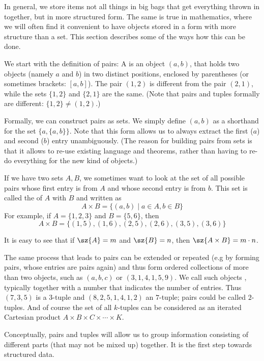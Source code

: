 In general, we store items not all things in big bags that get everything thrown in
together, but in more structured form. The same is true in mathematics,
where we will often find it convenient to have objects stored in a form with
more structure than a set. This section describes some of the ways how this
can be done.

We start with the definition of pairs: A  is an object $(a,b)$,
that holds two objects (namely $a$ and $b$) in two distinct positions,
enclosed by parentheses (or sometimes brackets: $[a,b]$). The
pair $(1,2)$ is different from the pair $(2,1)$, while the sets $\{1,2\}$
and $\{2,1\}$ are the same. (Note that pairs and tuples formally are
different: $\{1,2\}\not=(1,2)$.)

Formally, we can construct pairs as sets. We simply define $(a,b)$ as a
shorthand for the set $\{a,\{a,b\}\}$. Note that this form allows us to
always extract the first ($a$) and second ($b$) entry unambiguously. (The
reason for building pairs from sets is that it allows to re-use existing
language and theorems, rather than having to re-do everything for the new
kind of objects.)
\medskip

If we have two sets $A,B$, we sometimes want to look at the set of all
possible pairs whose first entry is from $A$ and whose second entry is from
$b$.
This set is called the 
of $A$ with
$B$ and written as
\[
A\times B=\{(a,b)\mid a\in A,b\in B\}
\]
For example, if $A=\{1,2,3\}$ and $B=\{5,6\}$, then
\[
A\times B=\{(1,5),(1,6),(2,5),(2,6),(3,5),(3,6)\}
\]

It is easy to see that if $\sz{A}=m$ and $\sz{B}=n$, then $\sz{A\times
B}=m\cdot n$.
\medskip

The same process that leads to pairs can be extended or repeated (e.g by
forming pairs, whose entries are pairs again) and thus form ordered
collections of more than two objects, such as $(a,b,c)$ or $(3,1,4,1,5,9)$.
We call such objects ,
typically together with a number that
indicates the number of entries.
Thus $(7,3,5)$ is a $3$-tuple and $(8,2,5,1,4,1,2)$ an $7$-tuple; pairs
could be called $2$-tuples. 
And of course the set of all $k$-tuples can be considered as an iterated
Cartesian product $A\times B\times C\times\cdots\times K$.
\medskip

Conceptually, pairs and tuples will allow us to group information consisting
of different parts (that may not be mixed up) together. It is the first step
towards structured data.

